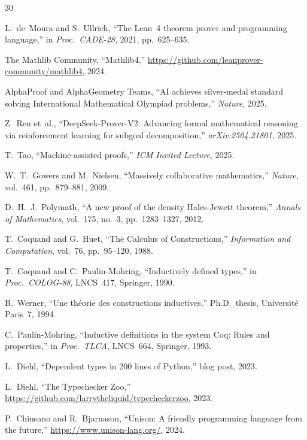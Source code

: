 \documentclass[11pt]{article}
\theoremstyle{definition}
\theoremstyle{plain}
\theoremstyle{remark}
\begin{document}
\begin{thebibliography}{30}

L.~de~Moura and S.~Ullrich,
``The Lean~4 theorem prover and programming language,''
in \emph{Proc.\ CADE-28}, 2021, pp.~625--635.

The Mathlib Community,
``Mathlib4,''
\url{https://github.com/leanprover-community/mathlib4}, 2024.

AlphaProof and AlphaGeometry Teams,
``AI achieves silver-medal standard solving International Mathematical Olympiad problems,''
\emph{Nature}, 2025.

Z.~Ren et~al.,
``DeepSeek-Prover-V2: Advancing formal mathematical reasoning via reinforcement learning for subgoal decomposition,''
\emph{arXiv:2504.21801}, 2025.

T.~Tao,
``Machine-assisted proofs,''
\emph{ICM Invited Lecture}, 2025.

W.~T.~Gowers and M.~Nielsen,
``Massively collaborative mathematics,''
\emph{Nature}, vol.~461, pp.~879--881, 2009.

D.~H.~J.~Polymath,
``A new proof of the density Hales-Jewett theorem,''
\emph{Annals of Mathematics}, vol.~175, no.~3, pp.~1283--1327, 2012.

T.~Coquand and G.~Huet,
``The Calculus of Constructions,''
\emph{Information and Computation}, vol.~76, pp.~95--120, 1988.

T.~Coquand and C.~Paulin-Mohring,
``Inductively defined types,''
in \emph{Proc.\ COLOG-88}, LNCS~417, Springer, 1990.

B.~Werner,
``Une th\'eorie des constructions inductives,''
Ph.D.\ thesis, Universit\'e Paris~7, 1994.

C.~Paulin-Mohring,
``Inductive definitions in the system Coq: Rules and properties,''
in \emph{Proc.\ TLCA}, LNCS~664, Springer, 1993.

L.~Diehl,
``Dependent types in 200 lines of Python,''
blog post, 2023.

L.~Diehl,
``The Typechecker Zoo,''
\url{https://github.com/larrytheliquid/typecheckerzoo}, 2023.

P.~Chiusano and R.~Bjarnason,
``Unison: A friendly programming language from the future,''
\url{https://www.unison-lang.org/}, 2024.


\end{thebibliography}
\end{document}
